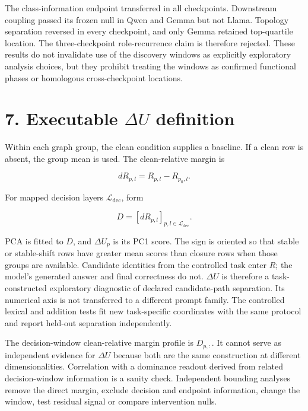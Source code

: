 \documentclass[10pt]{article}
\begin{document}
The class-information endpoint transferred in all checkpoints. Downstream coupling passed its frozen null in Qwen and Gemma but not Llama. Topology separation reversed in every checkpoint, and only Gemma retained top-quartile location. The three-checkpoint role-recurrence claim is therefore rejected. These results do not invalidate use of the discovery windows as explicitly exploratory analysis choices, but they prohibit treating the windows as confirmed functional phases or homologous cross-checkpoint locations.

\section*{7. Executable \(\Delta U\) definition}

Within each graph group, the clean condition supplies a baseline. If a clean row is absent, the group mean is used. The clean-relative margin is

\begin{equation*}
dR_{p,l}=R_{p,l}-R_{p_0,l}.
\end{equation*}

For mapped decision layers \(\mathcal L_{\mathrm{dec}}\), form

\begin{equation*}
D=[dR_{p,l}]_{p,l\in\mathcal L_{\mathrm{dec}}}.
\end{equation*}

PCA is fitted to \(D\), and \(\Delta U_p\) is its PC1 score. The sign is oriented so that stable or stable-shift rows have greater mean scores than closure rows when those groups are available. Candidate identities from the controlled task enter \(R\); the model's generated answer and final correctness do not. \(\Delta U\) is therefore a task-constructed exploratory diagnostic of declared candidate-path separation. Its numerical axis is not transferred to a different prompt family. The controlled lexical and addition tests fit new task-specific coordinates with the same protocol and report held-out separation independently.

The decision-window clean-relative margin profile is \(D_{p,:}\). It cannot serve as independent evidence for \(\Delta U\) because both are the same construction at different dimensionalities. Correlation with a dominance readout derived from related decision-window information is a sanity check. Independent bounding analyses remove the direct margin, exclude decision and endpoint information, change the window, test residual signal or compare intervention nulls.
\end{document}
